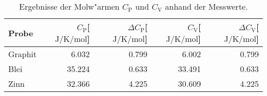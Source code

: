 
\begin{table}[!h]
\begin{center}
\begin{tabular}{|l|r|r|r|r|}
\hline
Probe & $C_\mathrm{P}$[$\SI{}{\joule\per\kelvin\per\mol}$] & $\Delta C_\mathrm{P}$[$\SI{}{\joule\per\kelvin\per\mol}$] & $C_\mathrm{V}$[$\SI{}{\joule\per\kelvin\per\mol}$] & $\Delta C_\mathrm{V}$[$\SI{}{\joule\per\kelvin\per\mol}$]\\
\hline
\hline
Graphit & 6.032  & 0.799 & 6.002  & 0.799\\
Blei    & 35.224 & 0.633 & 33.491 & 0.633\\
Zinn    & 32.366 & 4.225 & 30.609 & 4.225\\
\hline
\end{tabular}
\caption[]{Ergebnisse der Molw"armen $C_\mathrm{P}$ und $C_\mathrm{V}$ anhand der Messwerte.}
\label{warm}
\end{center}
\end{table}